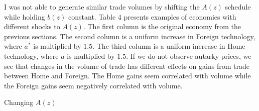 \documentclass[11pt]{article}
\begin{document}
I was not able to generate similar trade volumes by shifting the $A(z)$ schedule while holding $b(z)$ constant. Table 4 presents examples of economies with different shocks to $A(z)$. The first column is the original economy from the previous sections. The second column is a uniform increase in Foreign technology, where $a^*$ is multiplied by $1.5$. The third column is a uniform increase in Home technology, where $a$ is multiplied by $1.5$. If we do not observe autarky prices, we see that changes in the volume of trade has different effects on gains from trade between Home and Foreign. The Home gains seem correlated with volume while the Foreign gains seem negatively correlated with volume. 
\begin{table}[H]
    \centering
    \caption{Changing $A(z)$}
    
\end{table}
\end{document}
